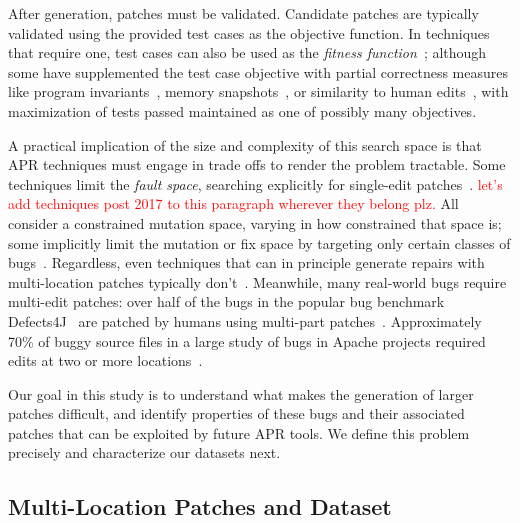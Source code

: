 \documentclass[10pt, conference]{IEEEtran}
\newcommand\todo[1]{\textcolor{red}{#1}}
\begin{document}
After generation, patches must be validated. Candidate patches are typically
validated using the provided test cases as the objective function. In techniques
that require one, test cases can also be used as the \emph{fitness
  function}~\cite{genprog}; although some have supplemented the test case
objective with partial correctness measures like program
invariants~\cite{dinglyu}, memory snapshots~\cite{source-code-checkpoint}, or
similarity to human edits~\cite{hdrepair}, with maximization of tests passed
maintained as one of possibly many objectives.

A practical implication of the size and complexity of this search space is
that APR techniques must engage in trade offs to render the problem tractable. 
Some techniques limit the \emph{fault space},
searching explicitly for single-edit patches~\cite{rsrepair,ae,hdrepair}.
\todo{let's add techniques post 2017 to this paragraph wherever they belong
  plz.}
All consider a constrained mutation space, varying in how constrained that space
is; some implicitly limit the mutation or fix space by targeting only certain
classes of bugs~\cite{Xuan17,sapfix,DeMarco14,par}. Regardless, even techniques
that can in principle generate repairs with multi-location patches typically
don't~\cite{patch-correctness}.
%
Meanwhile, many real-world bugs require multi-edit patches: over half of the
bugs in the popular bug benchmark Defects4J~\cite{defects4j} are patched by
humans using multi-part patches~\cite{d4j-dissection}. Approximately 70\% of
buggy source files in a large study of bugs in Apache projects required edits at
two or more locations~\cite{zhong2015}.

Our goal in this study is to understand what makes the generation of larger
patches difficult, and identify properties of these bugs and their associated
patches that can be exploited by future APR tools.  
We define this problem precisely and characterize our datasets next.

\subsection{Multi-Location Patches and Dataset}
\end{document}
